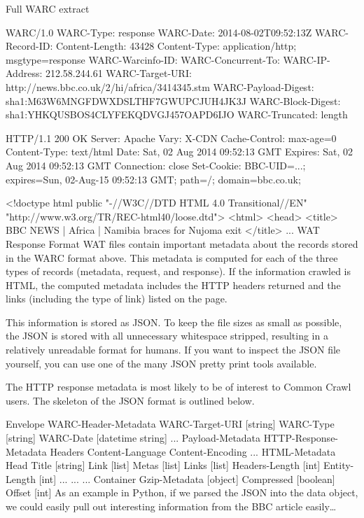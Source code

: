 \documentclass{article}
\begin{document}
Full WARC extract

WARC/1.0
WARC-Type: response
WARC-Date: 2014-08-02T09:52:13Z
WARC-Record-ID: 
Content-Length: 43428
Content-Type: application/http; msgtype=response
WARC-Warcinfo-ID: 
WARC-Concurrent-To: 
WARC-IP-Address: 212.58.244.61
WARC-Target-URI: http://news.bbc.co.uk/2/hi/africa/3414345.stm
WARC-Payload-Digest: sha1:M63W6MNGFDWXDSLTHF7GWUPCJUH4JK3J
WARC-Block-Digest: sha1:YHKQUSBOS4CLYFEKQDVGJ457OAPD6IJO
WARC-Truncated: length

HTTP/1.1 200 OK
Server: Apache
Vary: X-CDN
Cache-Control: max-age=0
Content-Type: text/html
Date: Sat, 02 Aug 2014 09:52:13 GMT
Expires: Sat, 02 Aug 2014 09:52:13 GMT
Connection: close
Set-Cookie: BBC-UID=...; expires=Sun, 02-Aug-15 09:52:13 GMT; path=/; domain=bbc.co.uk;

<!doctype html public "-//W3C//DTD HTML 4.0 Transitional//EN" "http://www.w3.org/TR/REC-html40/loose.dtd">
<html>
<head>
<title>
	BBC NEWS | Africa | Namibia braces for Nujoma exit
</title>
...
WAT Response Format
WAT files contain important metadata about the records stored in the WARC format above. This metadata is computed for each of the three types of records (metadata, request, and response). If the information crawled is HTML, the computed metadata includes the HTTP headers returned and the links (including the type of link) listed on the page.

This information is stored as JSON. To keep the file sizes as small as possible, the JSON is stored with all unnecessary whitespace stripped, resulting in a relatively unreadable format for humans. If you want to inspect the JSON file yourself, you can use one of the many JSON pretty print tools available.

The HTTP response metadata is most likely to be of interest to Common Crawl users. The skeleton of the JSON format is outlined below.

Envelope
  WARC-Header-Metadata
    WARC-Target-URI [string]
    WARC-Type [string]
    WARC-Date [datetime string]
    ...
  Payload-Metadata
    HTTP-Response-Metadata
      Headers
        Content-Language
        Content-Encoding
        ...
      HTML-Metadata
        Head
          Title [string]
          Link [list]
          Metas [list]
        Links [list]
      Headers-Length [int]
      Entity-Length [int]
      ...
    ...
  ...
Container
  Gzip-Metadata [object]
  Compressed [boolean]
  Offset [int]
As an example in Python, if we parsed the JSON into the data object, we could easily pull out interesting information from the BBC article easily…
\end{document}
